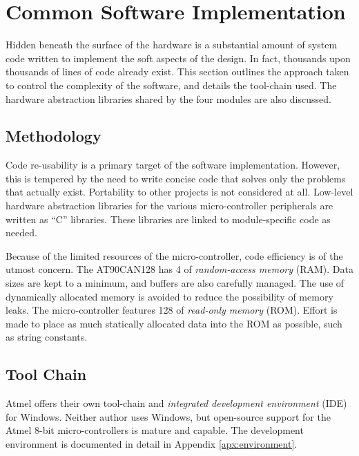 \section{Common Software Implementation\label{sec:common_software_implementation}}

Hidden beneath the surface of the hardware is a substantial amount of system code written to implement the soft aspects of the design. In fact, thousands upon thousands of lines of code already exist. This section outlines the approach taken to control the complexity of the software, and details the tool-chain used. The hardware abstraction libraries shared by the four modules are also discussed.

\subsection{Methodology}
\label{sec:imp_software_meth}

Code re-usability is a primary target of the software implementation. However, this is tempered by the need to write concise code that solves only the problems that actually exist. Portability to other projects is not considered at all. Low-level hardware abstraction libraries for the various micro-controller peripherals are written as ``C'' libraries. These libraries are linked to module-specific code as needed. 


Because of the limited resources of the micro-controller, code efficiency is of the utmost concern. The AT90CAN128 has \unit{4}{\kilo\byte} of \emph{random-access memory} (RAM). Data sizes are kept to a minimum, and buffers are also carefully managed. The use of dynamically allocated memory is avoided to reduce the possibility of memory leaks. The micro-controller features \unit{128}{\kilo\byte} of \emph{read-only memory} (ROM). Effort is made to place as much statically allocated data into the ROM as possible, such as string constants.

\subsection{Tool Chain}

Atmel offers their own tool-chain and \emph{integrated development environment} (IDE) for Windows. Neither author uses Windows, but open-source support for the Atmel 8-bit micro-controllers is mature and capable. The development environment is documented in detail in Appendix \ref{apx:environment}.

